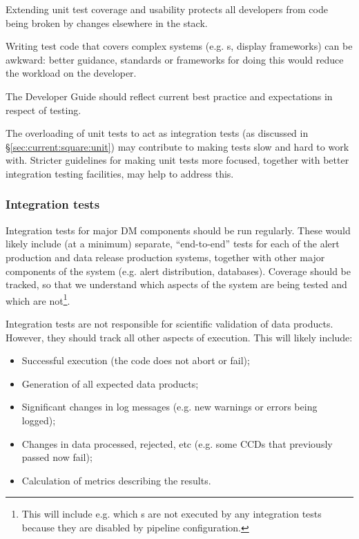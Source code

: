 \documentclass[DM,authoryear,toc,lsstdraft]{lsstdoc}
\begin{document}
Extending unit test coverage and usability protects all developers from code
being broken by changes elsewhere in the stack.

Writing test code that covers complex systems (e.g. s, display
frameworks) can be awkward: better guidance, standards or frameworks for doing
this would reduce the workload on the developer.

The Developer Guide should reflect current best practice and expectations in
respect of testing.

The overloading of unit tests to act as integration tests (as discussed in
\S\ref{sec:current:square:unit}) may contribute to making tests slow and hard
to work with. Stricter guidelines for making unit tests more focused, together
with better integration testing facilities, may help to address this.

\subsubsection{Integration tests}

Integration tests for major DM components should be run regularly. These would
likely include (at a minimum) separate, ``end-to-end'' tests for each of the
alert production and data release production systems, together with other
major components of the system (e.g. alert distribution, databases). Coverage
should be tracked, so that we understand which aspects of the system are being
tested and which are not\footnote{This will include e.g. which s
are not executed by any integration tests because they are disabled by
pipeline configuration.}.

Integration tests are not responsible for scientific validation of data
products. However, they should track all other aspects of execution. This will
likely include:

\begin{itemize}

  \item{Successful execution (the code does not abort or fail);}
  \item{Generation of all expected data products;}
  \item{Significant changes in log messages (e.g. new warnings or errors being
  logged);}
  \item{Changes in data processed, rejected, etc (e.g. some CCDs that
  previously passed now fail);}
  \item{Calculation of \glspl{metric} describing the results.}

\end{itemize}
\end{document}
